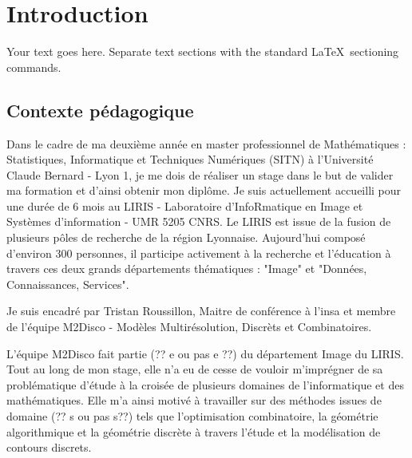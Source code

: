 %
%
%

\chapter{Introduction}
\label{pt1-ch1-intro} %

Your text goes here. Separate text sections with the standard \LaTeX\
sectioning commands.

\section{Contexte pédagogique}
\label{pt1-ch1-sec:1}

Dans le cadre de ma deuxième année en master professionnel de Mathématiques : Statistiques, Informatique et Techniques Numériques (SITN) à l’Université Claude Bernard - Lyon 1, je me dois de réaliser un stage dans le but de valider ma formation et d'ainsi obtenir mon diplôme. \newline
Je suis actuellement accueilli pour une durée de 6 mois au LIRIS - Laboratoire d'InfoRmatique en Image et Systèmes d'information - UMR 5205 CNRS. Le LIRIS est issue de la fusion de plusieurs pôles de recherche de la région Lyonnaise. Aujourd'hui composé d'environ 300 personnes, il participe activement à la recherche et l'éducation à travers ces deux grands départements thématiques : "Image" et "Données, Connaissances, Services".\newline

Je suis encadré par Tristan Roussillon, Maitre de conférence à l'insa et membre de l'équipe M2Disco - Modèles Multirésolution, Discrèts et Combinatoires. \newline

L'équipe M2Disco fait partie (?? e ou pas e ??) du département Image du LIRIS. Tout au long de mon stage, elle n'a eu de cesse de vouloir m'imprégner de sa problématique d'étude à la croisée de plusieurs domaines de l’informatique et des mathématiques. Elle m'a ainsi motivé à travailler sur des méthodes issues de domaine (?? s ou pas s??) tels que l'optimisation combinatoire, la géométrie algorithmique et la géométrie discrète à travers l'étude et la modélisation de contours discrets.\newline

